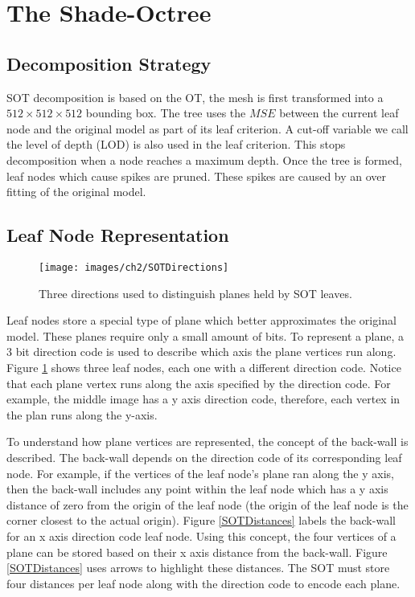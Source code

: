 \section{The Shade-Octree}

\subsection{Decomposition Strategy}

SOT decomposition is based on the OT, the mesh is first transformed into a $512\times 512\times 512$ bounding box. The tree uses the $MSE$ between the current leaf node and the original model as part of its leaf criterion. A cut-off variable we call the level of depth (LOD) is also used in the leaf criterion. This stops decomposition when a node reaches a maximum depth. Once the tree is formed, leaf nodes which cause spikes are pruned. These spikes are caused by an over fitting of the original model.

\subsection{Leaf Node Representation}

\begin{figure}[!h]
\centering
\texttt{[image: images/ch2/SOTDirections]}
\caption{Three directions used to distinguish planes held by SOT leaves.}
\label{SOTDirections}
\end{figure}

Leaf nodes store a special type of plane which better approximates the original model. These planes require only a small amount of bits. To represent a plane, a 3 bit direction code is used to describe which axis the plane vertices run along. Figure \ref{SOTDirections} shows three leaf nodes, each one with a different direction code.  Notice that each plane vertex runs along the axis specified by the direction code. For example, the middle image has a y axis direction code, therefore, each vertex in the plan runs along the y-axis.

To understand how plane vertices are represented, the concept of the back-wall is described. The back-wall depends on the direction code of its corresponding leaf node. For example, if the vertices of the leaf node's plane ran along the y axis, then the back-wall includes any point within the leaf node which has a y axis distance of zero from the origin of the leaf node (the origin of the leaf node is the corner closest to the actual origin). Figure \ref{SOTDistances} labels the back-wall for an x axis direction code leaf node. Using this concept, the four vertices of a plane can be stored based on their x axis distance from the back-wall. Figure \ref{SOTDistances} uses arrows to highlight these distances. The SOT must store four distances per leaf node along with the direction code to encode each plane. 

